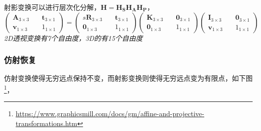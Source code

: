 \documentclass[hpyerref,UTF8,a4paper,titlepage,12pt,oneside]{ctexbook}
\theoremstyle{definition}
\begin{document}
		射影变换可以进行层次化分解，$\mathbf{H} = \mathbf{H_S}\mathbf{H_A}\mathbf{H_P}$，
		$$
			\begin{pmatrix}
				\mathbf{A}_{3\times 3}\quad& \mathbf{t}_{3\times 1}\\
				\mathbf{v}_{1\times 3} \quad& 1_{1\times 1}
			\end{pmatrix}
			=
			\begin{pmatrix}
				s\mathbf{R}_{3\times 3}\quad & \mathbf{t}_{3\times 1}\\
				\mathbf{0}_{1\times 3}\quad & 1_{1\times 1}
			\end{pmatrix}
			\begin{pmatrix}
				\mathbf{K}_{3\times 3}\quad & \mathbf{0}_{3\times 1}\\
				\mathbf{0}_{1\times 3}\quad & 1_{1\times 1}
			\end{pmatrix}
			\begin{pmatrix}
				\mathbf{I}_{3\times 3}\quad & \mathbf{0}_{3\times 1}\\
				\mathbf{v}_{1\times 3}\quad & 1_{1\times 1}
			\end{pmatrix}
		$$
		\textit{2D透视变换有7个自由度，3D的有15个自由度}
	\subsubsection{仿射恢复}

		仿射变换使得无穷远点保持不变，而射影变换则使得无穷远点变为有限点，如下图\footnote{\url{https://www.graphicsmill.com/docs/gm/affine-and-projective-transformations.htm}}，
\end{document}
